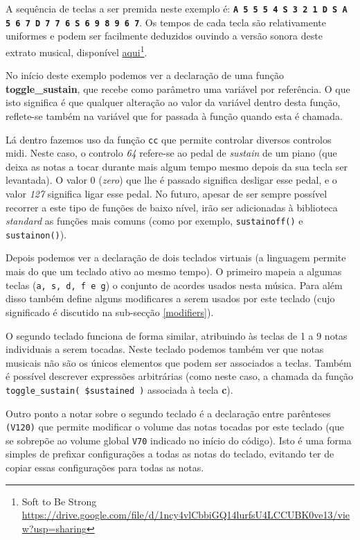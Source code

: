 A sequência de teclas a ser premida neste exemplo é: \textbf{\texttt{A 5 5 5 4 S 3 2 1 D S A 5 6 7 D 7 7 6 S 6 9 8 9 6 7}}. Os tempos de cada tecla são relativamente uniformes e podem ser facilmente deduzidos ouvindo a versão sonora deste extrato musical, disponível \href{https://drive.google.com/file/d/1ncy4vlCbbiGQ14lurfsU4LCCUBK0ve13/view?usp=sharing}{aqui}\footnote{Soft to Be Strong \url{https://drive.google.com/file/d/1ncy4vlCbbiGQ14lurfsU4LCCUBK0ve13/view?usp=sharing}}.

No início deste exemplo podemos ver a declaração de uma função \textbf{toggle\_sustain}, que recebe como parâmetro uma variável por referência. O que isto significa é que qualquer alteração ao valor da variável dentro desta função, reflete-se também na variável que for passada à função quando esta é chamada. 

Lá dentro fazemos uso da função \texttt{cc} que permite controlar diversos controlos \acrshort{midi}. Neste caso, o controlo \textit{64} refere-se ao pedal de \textit{sustain} de um piano (que deixa as notas a tocar durante mais algum tempo mesmo depois da sua tecla ser levantada). O valor 0 (\textit{zero}) que lhe é passado significa desligar esse pedal, e o valor \textit{127} significa ligar esse pedal. No futuro, apesar de ser sempre possível recorrer a este tipo de funções de baixo nível, irão ser adicionadas à biblioteca \textit{standard} as funções mais comuns (como por exemplo, \texttt{sustainoff()} e \texttt{sustainon()}).

Depois podemos ver a declaração de dois teclados virtuais (a linguagem permite mais do que um teclado ativo ao mesmo tempo). O primeiro mapeia a algumas teclas (\texttt{a, s, d, f e g}) o conjunto de acordes usados nesta música. Para além disso também define alguns modificares a serem usados por este teclado (cujo significado é discutido na sub-secção \ref{modifiers}).

O segundo teclado funciona de forma similar, atribuindo às teclas de 1 a 9 notas individuais a serem tocadas. Neste teclado podemos também ver que notas musicais não são os únicos elementos que podem ser associados a teclas. Também é possível descrever expressões arbitrárias (como neste caso, a chamada da função \texttt{toggle\_sustain( \$sustained )} associada à tecla \textbf{c}).

Outro ponto a notar sobre o segundo teclado é a declaração entre parênteses \texttt{(V120)} que permite modificar o volume das notas tocadas por este teclado (que se sobrepõe ao volume global \texttt{V70} indicado no início do código). Isto é uma forma simples de prefixar configurações a todas as notas do teclado, evitando ter de copiar essas configurações para todas as notas.

